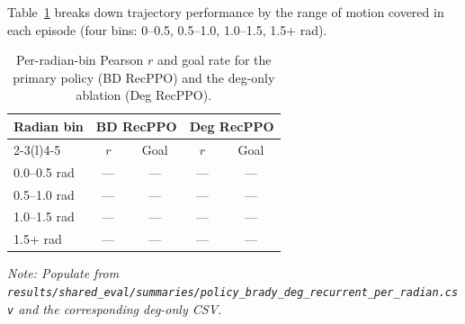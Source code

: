 \documentclass[letterpaper]{article} %
\begin{document}
Table~\ref{tab:app_radian} breaks down trajectory performance by the range of
motion covered in each episode (four bins: 0–0.5, 0.5–1.0, 1.0–1.5, 1.5+ rad).

\begin{table}[tbp]
  \centering
  \caption{Per-radian-bin Pearson $r$ and goal rate for the primary policy
    (BD RecPPO) and the deg-only ablation (Deg RecPPO).}
  \label{tab:app_radian}
  \small
  \begin{tabular}{lcccc}
    \toprule
    \textbf{Radian bin}
      & \multicolumn{2}{c}{\textbf{BD RecPPO}}
      & \multicolumn{2}{c}{\textbf{Deg RecPPO}} \\
    \cmidrule(r){2-3}\cmidrule(l){4-5}
      & $r$ & Goal & $r$ & Goal \\
    \midrule
    0.0–0.5 rad  & — & — & — & — \\
    0.5–1.0 rad  & — & — & — & — \\
    1.0–1.5 rad  & — & — & — & — \\
    1.5+ rad     & — & — & — & — \\
    \bottomrule
  \end{tabular}
  \vspace{0.4em}

  \small\textit{Note: Populate from
  \texttt{results/shared\_eval/summaries/policy\_brady\_deg\_recurrent\_per\_radian.csv}
  and the corresponding deg-only CSV.}
\end{table}
\end{document}
